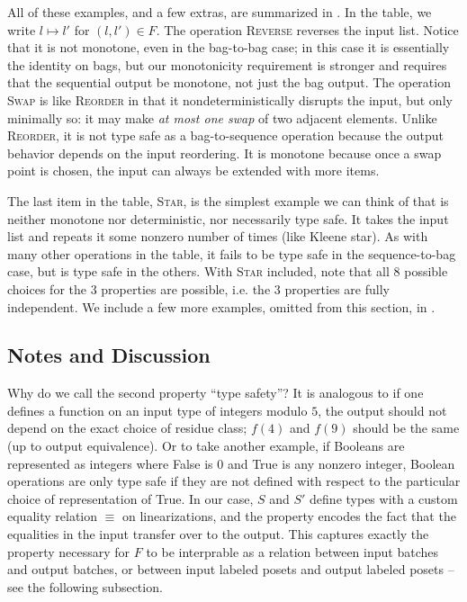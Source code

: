 All of these examples, and a few extras, are summarized in .
In the table, we write $l \mapsto l'$ for $(l, l') \in F$.
The operation \textsc{Reverse} reverses the input list.
Notice that it is not monotone, even in the bag-to-bag case;
in this case it is essentially the identity on bags, but our monotonicity
requirement is stronger and requires that the sequential output be monotone,
not just the bag output.
The operation \textsc{Swap} is like \textsc{Reorder} in that it nondeterministically disrupts the input, but only minimally so: it may make \emph{at most one swap} of two adjacent elements.
Unlike \textsc{Reorder}, it is not type safe as a bag-to-sequence operation because the output behavior depends on the input reordering.
It is monotone because once a swap point is chosen, the input can always be extended with more items.

The last item in the table, \textsc{Star}, is the simplest example we can think of that is neither monotone nor deterministic, nor necessarily type safe.
It takes the input list and repeats it some nonzero number of times (like Kleene star). As with many other operations in the table, it fails to be type safe in the sequence-to-bag case, but is type safe in the others.
With \textsc{Star} included, note that all 8 possible choices for the 3 properties are possible, i.e. the 3 properties are fully independent.
We include a few more examples, omitted from this section, in .

\subsection{Notes and Discussion}

Why do we call the second property ``type safety''? It is analogous to if one defines a function on an input type of integers modulo $5$, the output should not depend on the exact choice of residue class; $f(4)$ and $f(9)$ should be the same (up to output equivalence). Or to take another example, if Booleans are represented as integers where False is $0$ and True is any nonzero integer, Boolean operations are only type safe if they are not defined with respect to the particular choice of representation of True. In our case, $S$ and $S'$ define types with a custom equality relation $\equiv$ on linearizations, and the property encodes the fact that the equalities in the input transfer over to the output. This captures exactly the property necessary for $F$ to be interprable as a relation between input batches and output batches, or between input labeled posets and output labeled posets -- see the following subsection.

